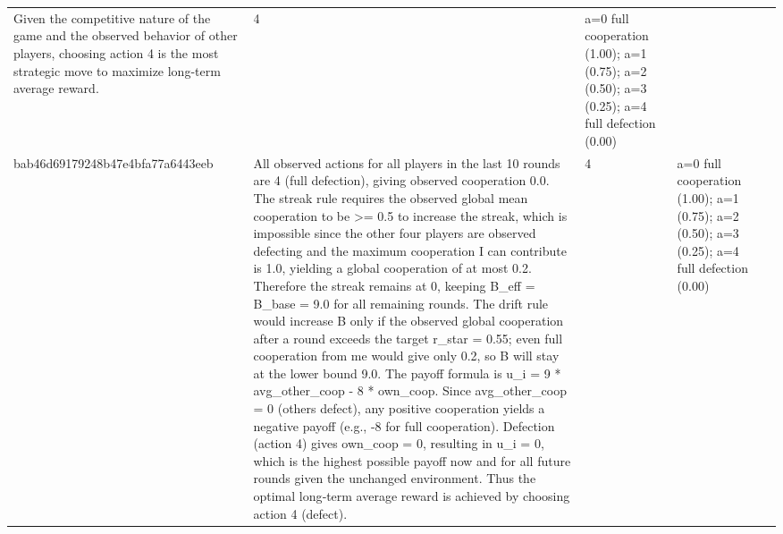 \begin{tabular}{lp{8cm}ll l}
Given the competitive nature of the game and the observed behavior of other players, choosing action 4 is the most strategic move to maximize long-term average reward. & 4 & a=0 full cooperation (1.00); a=1 (0.75); a=2 (0.50); a=3 (0.25); a=4 full defection (0.00) &  \\
bab46d69179248b47e4bfa77a6443eeb & All observed actions for all players in the last 10 rounds are 4 (full defection), giving observed cooperation 0.0. The streak rule requires the observed global mean cooperation to be >= 0.5 to increase the streak, which is impossible since the other four players are observed defecting and the maximum cooperation I can contribute is 1.0, yielding a global cooperation of at most 0.2. Therefore the streak remains at 0, keeping B\_eff = B\_base = 9.0 for all remaining rounds. The drift rule would increase B only if the observed global cooperation after a round exceeds the target r\_star = 0.55; even full cooperation from me would give only 0.2, so B will stay at the lower bound 9.0. The payoff formula is u\_i = 9 * avg\_other\_coop - 8 * own\_coop. Since avg\_other\_coop = 0 (others defect), any positive cooperation yields a negative payoff (e.g., -8 for full cooperation). Defection (action 4) gives own\_coop = 0, resulting in u\_i = 0, which is the highest possible payoff now and for all future rounds given the unchanged environment. Thus the optimal long‑term average reward is achieved by choosing action 4 (defect). & 4 & a=0 full cooperation (1.00); a=1 (0.75); a=2 (0.50); a=3 (0.25); a=4 full defection (0.00) &  \\
\bottomrule
\end{tabular}
